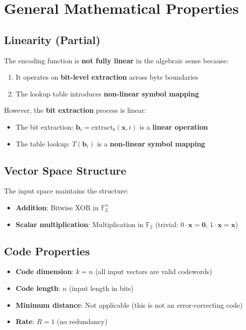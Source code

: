 \documentclass[11pt,a4paper]{article}
\begin{document}
\section{General Mathematical Properties}

\subsection{Linearity (Partial)}

The encoding function is \textbf{not fully linear} in the algebraic sense because:
\begin{enumerate}
\item It operates on \textbf{bit-level extraction} across byte boundaries
\item The lookup table introduces \textbf{non-linear symbol mapping}
\end{enumerate}

However, the \textbf{bit extraction} process is linear:
\begin{itemize}
\item The bit extraction: $\mathbf{b}_i = \text{extract}_b(\mathbf{x}, i)$ is a \textbf{linear operation}
\item The table lookup: $T(\mathbf{b}_i)$ is a \textbf{non-linear symbol mapping}
\end{itemize}

\subsection{Vector Space Structure}

The input space maintains the structure:
\begin{itemize}
\item \textbf{Addition}: Bitwise XOR in $\mathbb{F}_2^n$
\item \textbf{Scalar multiplication}: Multiplication in $\mathbb{F}_2$ (trivial: $0 \cdot \mathbf{x} = \mathbf{0}$, $1 \cdot \mathbf{x} = \mathbf{x}$)
\end{itemize}

\subsection{Code Properties}

\begin{itemize}
\item \textbf{Code dimension}: $k = n$ (all input vectors are valid codewords)
\item \textbf{Code length}: $n$ (input length in bits)
\item \textbf{Minimum distance}: Not applicable (this is not an error-correcting code)
\item \textbf{Rate}: $R = 1$ (no redundancy)
\end{itemize}
\end{document}
